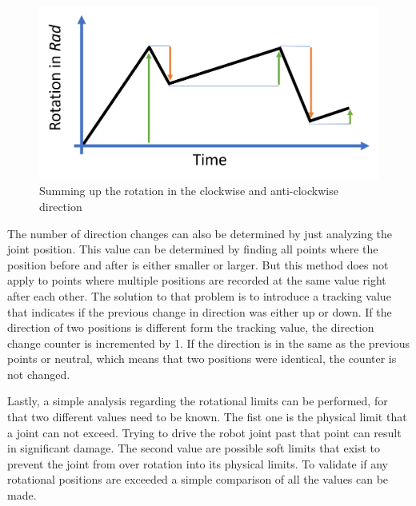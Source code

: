 \begin{figure}[H]
	\centerline{\includegraphics[scale=.55]{figures/travel.png}}
	\caption{Summing up the rotation in the clockwise and anti-clockwise direction }
	\label{travel}
\end{figure}

The number of direction changes can also be determined by just analyzing the joint position. This value can be determined by finding all points where the position before and after is either smaller or larger. But this method does not apply to points where multiple positions are recorded at the same value right after each other. The solution to that problem is to introduce a tracking value that indicates if the previous change in direction was either up or down. If the direction of two positions is different form the tracking value, the direction change counter is incremented by 1. If the direction is in the same as the previous points or neutral, which means that two positions were identical, the counter is not changed.


Lastly, a simple analysis regarding the rotational limits can be performed, for that two different values need to be known. The fist one is the physical limit that a joint can not exceed. Trying to drive the robot joint past that point can result in significant damage. The second value are possible soft limits that exist to prevent the joint from over rotation into its physical limits. To validate if any rotational positions are exceeded a simple comparison of all the values can be made.





